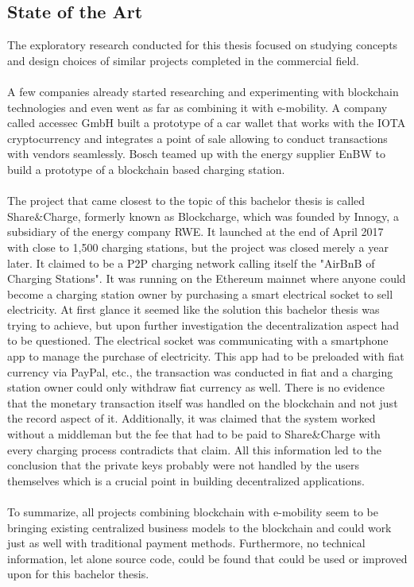\subsection{State of the Art}
The exploratory research conducted for this thesis focused on studying concepts and design choices of similar projects completed in the commercial field.
\\\\
A few companies already started researching and experimenting with blockchain technologies and even went as far as combining it with e-mobility.
A company called accessec GmbH built a prototype of a car wallet that works with the IOTA cryptocurrency and integrates a point of sale allowing to conduct transactions with vendors seamlessly\cite{car-wallet}.
Bosch teamed up with the energy supplier EnBW to build a prototype of a blockchain based charging station\cite{bosch-dlt}.
\\\\
The project that came closest to the topic of this bachelor thesis is called Share\&Charge, formerly known as Blockcharge\cite{share-charge}\cite{blockcharge}, which was founded by Innogy, a subsidiary of the energy company RWE\cite{innogy}.
It launched at the end of April 2017 with close to 1,500 charging stations, but the project was closed merely a year later\cite{share-charge-closed}.
It claimed to be a P2P charging network calling itself the "AirBnB of Charging Stations".
It was running on the Ethereum mainnet where anyone could become a charging station owner by purchasing a smart electrical socket to sell electricity.
At first glance it seemed like the solution this bachelor thesis was trying to achieve, but upon further investigation the decentralization aspect had to be questioned.
The electrical socket was communicating with a smartphone app to manage the purchase of electricity.
This app had to be preloaded with fiat currency via PayPal, etc., the transaction was conducted in fiat and a charging station owner could only withdraw fiat currency as well.
There is no evidence that the monetary transaction itself was handled on the blockchain and not just the record aspect of it.
Additionally, it was claimed that the system worked without a middleman but the fee that had to be paid to Share\&Charge with every charging process contradicts that claim.
All this information led to the conclusion that the private keys probably were not handled by the users themselves which is a crucial point in building decentralized applications.
\\\\
To summarize, all projects combining blockchain with e-mobility seem to be bringing existing centralized business models to the blockchain and could work just as well with traditional payment methods.
Furthermore, no technical information, let alone source code, could be found that could be used or improved upon for this bachelor thesis.
